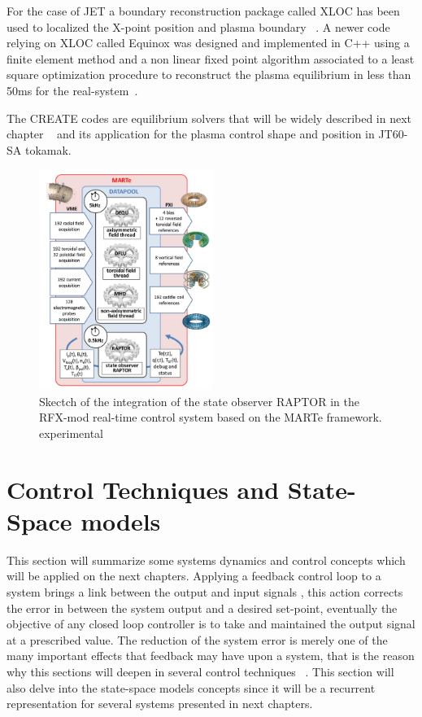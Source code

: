 For the case of JET  a  boundary reconstruction package called XLOC has been used to localized the X-point position and plasma boundary ~\cite{xloc}.  A newer code relying on XLOC  called Equinox was designed and implemented in C++ using a finite element method and a non linear fixed point algorithm associated to a least  square optimization procedure to reconstruct the plasma equilibrium in less than 50ms for the real-system~\cite{equinox}. 
\smallskip

The CREATE  codes are  equilibrium solvers that will be widely described in next chapter ~\cite{Albanese:CREATEL} and its application for the plasma control shape and  position in JT60-SA tokamak.
 
\begin{figure}[htbp]
	\centering
	\includegraphics[width=0.505\textwidth]{Chp2/raptorMARTe.png}
	\caption{\label{RaptorMARTe} Skectch of the integration of the state observer RAPTOR in the RFX-mod real-time control system based on the MARTe framework.
		experimental \cite{Raptor}}
	
\end{figure}

\section{Control Techniques and State-Space models}

This section will summarize  some systems dynamics and control  concepts which will be applied on the next chapters. Applying a feedback control loop to a system  brings a link between the output and input signals , this action corrects the error in between the system output and a desired set-point,  eventually  the objective  of any closed loop controller is to take and maintained  the output signal at a prescribed value. The reduction of the system error is merely one of the many important effects that feedback may have upon a system, that is the reason why this sections will deepen in several control techniques ~\cite[Chapter~1]{Golnaraghi2010}. This section will also delve into the state-space models concepts since it will be a recurrent representation  for several systems presented in next chapters.

